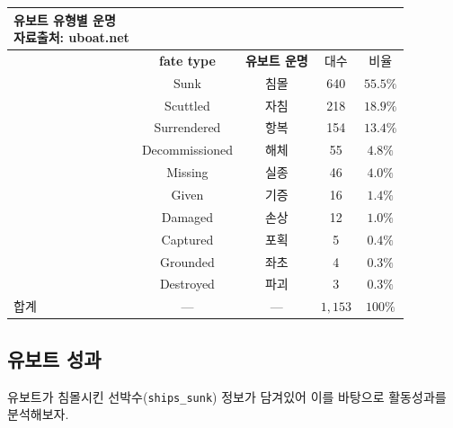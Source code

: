 \documentclass[
  letterpaper,
  chapter,a4paper,showtrims,openright,hidelinks]{oblivoir}
\begin{document}
\begin{longtable*}{l|cccc}
\caption*{
{\large 유보트 유형별 운명} \\ 
{\small 자료출처: uboat.net}
} \\ 
\toprule
{} & \textbf{fate type} & \textbf{유보트 운명} & 대수 & 비율 \\ 
\midrule
 & Sunk & 침몰 & 640 & $55.5\%$ \\ 
 & Scuttled & 자침 & 218 & $18.9\%$ \\ 
 & Surrendered & 항복 & 154 & $13.4\%$ \\ 
 & Decommissioned & 해체 & 55 & $4.8\%$ \\ 
 & Missing & 실종 & 46 & $4.0\%$ \\ 
 & Given & 기증 & 16 & $1.4\%$ \\ 
 & Damaged & 손상 & 12 & $1.0\%$ \\ 
 & Captured & 포획 & 5 & $0.4\%$ \\ 
 & Grounded & 좌초 & 4 & $0.3\%$ \\ 
 & Destroyed & 파괴 & 3 & $0.3\%$ \\ 
\midrule 
\midrule 
합계 & — & — & $1,153$ & $100\%$ \\ 
\bottomrule
\end{longtable*}

\hypertarget{uxc720uxbcf4uxd2b8-uxc131uxacfc}{%
\subsection{유보트 성과}\label{uxc720uxbcf4uxd2b8-uxc131uxacfc}}

유보트가 침몰시킨 선박수(\texttt{ships\_sunk}) 정보가 담겨있어 이를
바탕으로 활동성과를 분석해보자.
\end{document}
